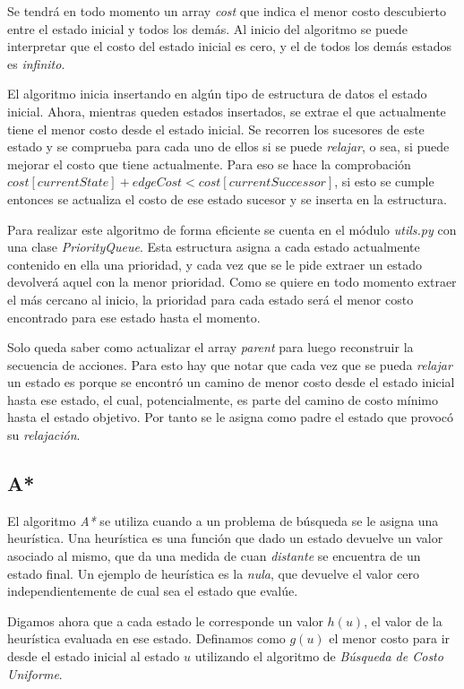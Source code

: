 \documentclass[12pt]{article}
\begin{document}
Se tendr\'a en todo momento un array \emph{cost} que indica el menor costo descubierto entre el estado inicial y todos los dem\'as. Al inicio del algoritmo se puede interpretar que el costo del estado inicial es cero, y el de todos los dem\'as estados es \emph{infinito}.

El algoritmo inicia insertando en alg\'un tipo de estructura de datos el estado inicial. Ahora, mientras queden estados insertados, se extrae el que actualmente tiene el menor costo desde el estado inicial. Se recorren los sucesores de este estado y se comprueba para cada uno de ellos si se puede \emph{relajar}, o sea, si puede mejorar el costo que tiene actualmente. Para eso se hace la comprobaci\'on $cost[currentState] + edgeCost < cost[currentSuccessor]$, si esto se cumple entonces se actualiza el costo de ese estado sucesor y se inserta en la estructura.

Para realizar este algoritmo de forma eficiente se cuenta en el m\'odulo \emph{utils.py} con una clase \emph{PriorityQueue}. Esta estructura asigna a cada estado actualmente contenido en ella una prioridad, y cada vez que se le pide extraer un estado devolver\'a aquel con la menor prioridad. Como se quiere en todo momento extraer el m\'as cercano al inicio, la prioridad para cada estado ser\'a el menor costo encontrado para ese estado hasta el momento.

Solo queda saber como actualizar el array \emph{parent} para luego reconstruir la secuencia de acciones. Para esto hay que notar que cada vez que se pueda \emph{relajar} un estado es porque se encontr\'o un camino de menor costo desde el estado inicial hasta ese estado, el cual, potencialmente, es parte del camino de costo m\'inimo hasta el estado objetivo. Por tanto se le asigna como padre el estado que provoc\'o su \emph{relajaci\'on}.

\subsection{A*}

El algoritmo \emph{A*} se utiliza cuando a un problema de b\'usqueda se le asigna una heur\'istica. Una heur\'istica es una funci\'on que dado un estado devuelve un valor asociado al mismo, que da una medida de cuan \emph{distante} se encuentra de un estado final. Un ejemplo de heur\'istica es la \emph{nula}, que devuelve el valor cero independientemente de cual sea el estado que eval\'ue.

Digamos ahora que a cada estado le corresponde un valor $h(u)$, el valor de la heur\'istica evaluada en ese estado. Definamos como $g(u)$ el menor costo para ir desde el estado inicial al estado $u$ utilizando el algoritmo de \emph{B\'usqueda de Costo Uniforme}.
\end{document}
